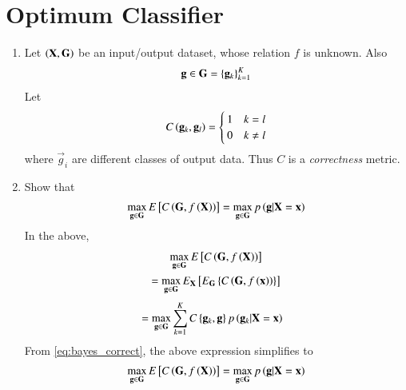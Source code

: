 \documentclass[journal,12pt,twocolumn]{IEEEtran}
\renewcommand\thesection{\arabic{section}}
\begin{document}
\section{Optimum Classifier}
\begin{enumerate}[label=\thesection.\arabic*
,ref=\thesection.\theenumi]
%
\item Let $\left(\mathbf{X},\mathbf{G}\right)$ be an input/output dataset, whose relation $f$ is unknown. Also
\begin{align}
\mathbf{g}\in\mathbf{G} = \left\{\mathbf{g}_k\right\}_{k=1}^{K}
\end{align}
Let 
\begin{align}
\label{eq:bayes_correct}
C\left(\mathbf{g}_k,\mathbf{g}_l\right) =
\begin{cases}
1 & k= l
\\
0 & k\ne l
\end{cases}
\end{align}
%
where $\vec{g}_i$ are different classes of output data. Thus $C$ is a {\em correctness} metric.
\item Show that 
\begin{align}
\max_{\mathbf{g}\in\mathbf{G}}E{}\left[C\left(\mathbf{G},f\left(\mathbf{X}\right)\right)\right] 
= \max_{\mathbf{g}\in\mathbf{G}}p\left(\mathbf{g}|\mathbf{X}=\mathbf{x}\right) 
\end{align}
\solution In the above, 
\begin{multline}
\max_{\mathbf{g}\in\mathbf{G}}E{}\left[C\left(\mathbf{G},f\left(\mathbf{X}\right)\right)\right] 
\\
= \max_{\mathbf{g}\in\mathbf{G}}E_\mathbf{X}{}\left[E_{\mathbf{G}}\left\{C\left(\mathbf{G},f\left(\mathbf{x}\right)\right)\right\}\right] 
\end{multline}
%
\begin{align}
&=\max_{\mathbf{g}\in\mathbf{G}}\sum_{k=1}^{K}C\left\{\mathbf{g}_k,\mathbf{g}\right\}p\left(\mathbf{g}_k|\mathbf{X}=\mathbf{x}\right) 
\end{align}
From \eqref{eq:bayes_correct}, the above expression simplifies to
\begin{align}
\max_{\mathbf{g}\in\mathbf{G}}E{}\left[C\left(\mathbf{G},f\left(\mathbf{X}\right)\right)\right] =\max_{\mathbf{g}\in\mathbf{G}}p\left(\mathbf{g}|\mathbf{X}=\mathbf{x}\right) 
\end{align}
%
\end{enumerate}
%
%
%
\end{document}
